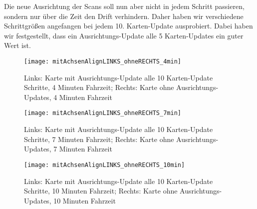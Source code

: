 Die neue Ausrichtung der Scans soll nun aber nicht in jedem Schritt passieren, sondern nur über die Zeit den Drift verhindern. Daher haben wir verschiedene Schrittgrößen angefangen bei jedem 10. Karten-Update ausprobiert. Dabei haben wir festgestellt, dass ein Ausrichtungs-Update alle 5 Karten-Updates ein guter Wert ist.

\begin{figure}
	\centering
	\texttt{[image: mitAchsenAlignLINKS\_ohneRECHTS\_4min]}
	\caption{Links: Karte mit Ausrichtungs-Update alle 10 Karten-Update Schritte, 4 Minuten Fahrzeit; Rechts: Karte ohne Ausrichtungs-Updates, 4 Minuten Fahrzeit}
	\label{fig:AchsenAlign_4min}
\end{figure}

\begin{figure}
	\centering
	\texttt{[image: mitAchsenAlignLINKS\_ohneRECHTS\_7min]}
	\caption{Links: Karte mit Ausrichtungs-Update alle 10 Karten-Update Schritte, 7 Minuten Fahrzeit; Rechts: Karte ohne Ausrichtungs-Updates, 7 Minuten Fahrzeit}
	\label{fig:AchsenAlign_7min}
\end{figure}

\begin{figure}
	\centering
	\texttt{[image: mitAchsenAlignLINKS\_ohneRECHTS\_10min]}
	\caption{Links: Karte mit Ausrichtungs-Update alle 10 Karten-Update Schritte, 10 Minuten Fahrzeit; Rechts: Karte ohne Ausrichtungs-Updates, 10 Minuten Fahrzeit}
	\label{fig:AchsenAlign_10min}
\end{figure}

\newpage